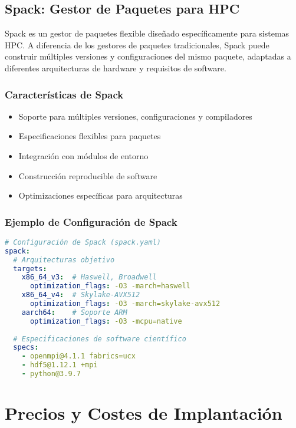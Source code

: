 \documentclass[12pt,a4paper]{report}
\begin{document}
\section{Spack: Gestor de Paquetes para HPC}

Spack es un gestor de paquetes flexible diseñado específicamente para sistemas HPC. A diferencia de los gestores de paquetes tradicionales, Spack puede construir múltiples versiones y configuraciones del mismo paquete, adaptadas a diferentes arquitecturas de hardware y requisitos de software.

\subsection{Características de Spack}

\begin{itemize}
    \item Soporte para múltiples versiones, configuraciones y compiladores
    \item Especificaciones flexibles para paquetes
    \item Integración con módulos de entorno
    \item Construcción reproducible de software
    \item Optimizaciones específicas para arquitecturas
\end{itemize}

\subsection{Ejemplo de Configuración de Spack}

\begin{lstlisting}[language=yaml]
# Configuración de Spack (spack.yaml)
spack:
  # Arquitecturas objetivo
  targets:
    x86_64_v3:  # Haswell, Broadwell
      optimization_flags: -O3 -march=haswell
    x86_64_v4:  # Skylake-AVX512
      optimization_flags: -O3 -march=skylake-avx512
    aarch64:    # Soporte ARM
      optimization_flags: -O3 -mcpu=native
  
  # Especificaciones de software científico
  specs:
    - openmpi@4.1.1 fabrics=ucx
    - hdf5@1.12.1 +mpi
    - python@3.9.7
\end{lstlisting}

\chapter{Precios y Costes de Implantación}
\end{document}
